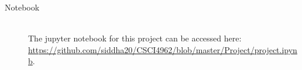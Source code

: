 \documentclass[12pt]{article}
\begin{document}
\begin{description}
    \item[Notebook] \hfill \\
    The jupyter notebook for this project can be accessed here: \\
    \url{https://github.com/siddha20/CSCI4962/blob/master/Project/project.ipynb}.
\end{description}
\end{document}
